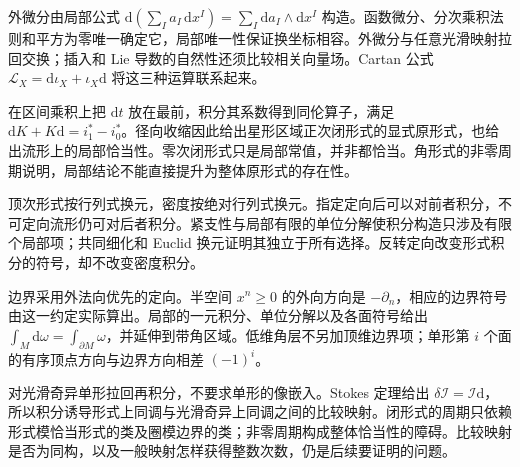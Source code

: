 \begin{chaptersummary}
	外微分由局部公式 \(\mathrm{d}(\sum_I a_I\,\mathrm{d}x^I)=\sum_I\mathrm{d}a_I\wedge\mathrm{d}x^I\) 构造。函数微分、分次乘积法则和平方为零唯一确定它，局部唯一性保证换坐标相容。外微分与任意光滑映射拉回交换；插入和 Lie 导数的自然性还须比较相关向量场。Cartan 公式 \(\mathcal L_X=\mathrm{d}\iota_X+\iota_X\mathrm{d}\) 将这三种运算联系起来。

	\ProseParagraphBreak

	在区间乘积上把 \(\mathrm{d}t\) 放在最前，积分其系数得到同伦算子，满足 \(\mathrm{d}K+K\mathrm{d}=i_1^*-i_0^*\)。径向收缩因此给出星形区域正次闭形式的显式原形式，也给出流形上的局部恰当性。零次闭形式只是局部常值，并非都恰当。角形式的非零周期说明，局部结论不能直接提升为整体原形式的存在性。

	\ProseParagraphBreak

	顶次形式按行列式换元，密度按绝对行列式换元。指定定向后可以对前者积分，不可定向流形仍可对后者积分。紧支性与局部有限的单位分解使积分构造只涉及有限个局部项；共同细化和 Euclid 换元证明其独立于所有选择。反转定向改变形式积分的符号，却不改变密度积分。

	\ProseParagraphBreak

	边界采用外法向优先的定向。半空间 \(x^n\geq0\) 的外向方向是 \(-\partial_n\)，相应的边界符号由这一约定实际算出。局部的一元积分、单位分解以及各面符号给出 \(\int_M\mathrm{d}\omega=\int_{\partial M}\omega\)，并延伸到带角区域。低维角层不另加顶维边界项；单形第 \(i\) 个面的有序顶点方向与边界方向相差 \((-1)^i\)。

	\ProseParagraphBreak

	对光滑奇异单形拉回再积分，不要求单形的像嵌入。Stokes 定理给出 \(\delta\mathcal I=\mathcal I\mathrm{d}\)，所以积分诱导形式上同调与光滑奇异上同调之间的比较映射。闭形式的周期只依赖形式模恰当形式的类及圈模边界的类；非零周期构成整体恰当性的障碍。比较映射是否为同构，以及一般映射怎样获得整数次数，仍是后续要证明的问题。
\end{chaptersummary}

\BookExercises

